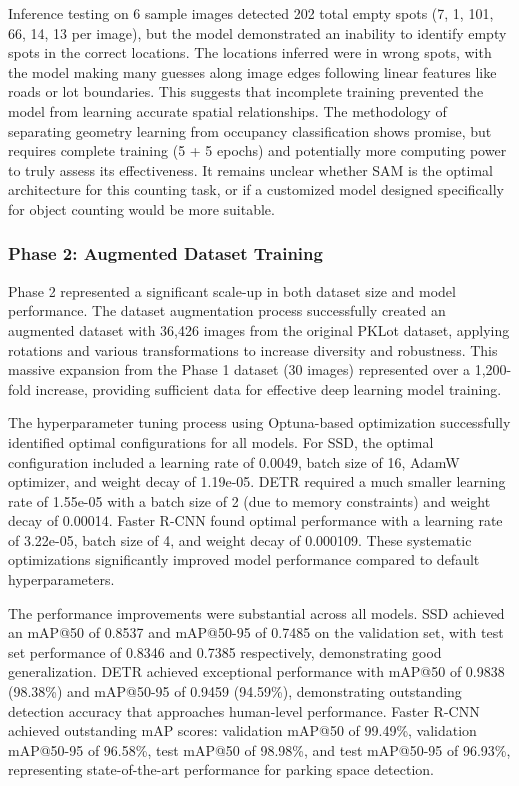 \documentclass[12pt,a4paper]{article}
\begin{document}
Inference testing on 6 sample images detected 202 total empty spots (7, 1, 101, 66, 14, 13 per image), but the model demonstrated an inability to identify empty spots in the correct locations. The locations inferred were in wrong spots, with the model making many guesses along image edges following linear features like roads or lot boundaries. This suggests that incomplete training prevented the model from learning accurate spatial relationships. The methodology of separating geometry learning from occupancy classification shows promise, but requires complete training (5 + 5 epochs) and potentially more computing power to truly assess its effectiveness. It remains unclear whether SAM is the optimal architecture for this counting task, or if a customized model designed specifically for object counting would be more suitable.

\subsubsection{Phase 2: Augmented Dataset Training}

Phase 2 represented a significant scale-up in both dataset size and model performance. The dataset augmentation process successfully created an augmented dataset with 36,426 images from the original PKLot dataset, applying rotations and various transformations to increase diversity and robustness. This massive expansion from the Phase 1 dataset (30 images) represented over a 1,200-fold increase, providing sufficient data for effective deep learning model training.

The hyperparameter tuning process using Optuna-based optimization successfully identified optimal configurations for all models. For SSD, the optimal configuration included a learning rate of 0.0049, batch size of 16, AdamW optimizer, and weight decay of 1.19e-05. DETR required a much smaller learning rate of 1.55e-05 with a batch size of 2 (due to memory constraints) and weight decay of 0.00014. Faster R-CNN found optimal performance with a learning rate of 3.22e-05, batch size of 4, and weight decay of 0.000109. These systematic optimizations significantly improved model performance compared to default hyperparameters.

The performance improvements were substantial across all models. SSD achieved an mAP@50 of 0.8537 and mAP@50-95 of 0.7485 on the validation set, with test set performance of 0.8346 and 0.7385 respectively, demonstrating good generalization. DETR achieved exceptional performance with mAP@50 of 0.9838 (98.38\%) and mAP@50-95 of 0.9459 (94.59\%), demonstrating outstanding detection accuracy that approaches human-level performance. Faster R-CNN achieved outstanding mAP scores: validation mAP@50 of 99.49\%, validation mAP@50-95 of 96.58\%, test mAP@50 of 98.98\%, and test mAP@50-95 of 96.93\%, representing state-of-the-art performance for parking space detection.
\end{document}
